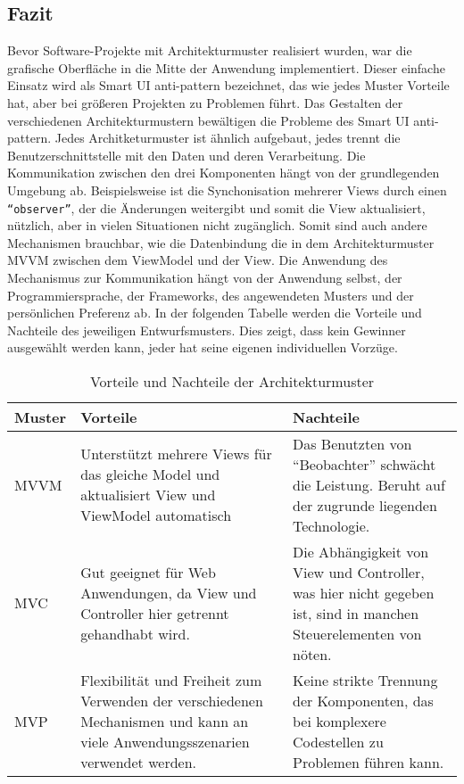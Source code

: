 \subsection{Fazit}
Bevor Software-Projekte mit Architekturmuster realisiert wurden, war die grafische Oberfl\"ache in die Mitte der Anwendung implementiert. Dieser einfache Einsatz wird als Smart \ac{UI} anti-pattern bezeichnet, das wie jedes Muster  Vorteile hat, aber bei gr\"o\ss{}eren Projekten zu Problemen f\"uhrt. Das Gestalten der verschiedenen Architekturmustern bew\"altigen die Probleme des Smart \ac{UI} anti-pattern. Jedes Architketurmuster ist \"ahnlich aufgebaut, jedes trennt die Benutzerschnittstelle mit den Daten und deren Verarbeitung. Die Kommunikation zwischen den drei Komponenten h\"angt von der grundlegenden Umgebung ab. Beispielsweise ist die Synchonisation mehrerer Views durch einen \texttt{\enquote{observer}}, der die \"Anderungen weitergibt und somit die View aktualisiert, n\"utzlich, aber in vielen Situationen nicht zug\"anglich. Somit sind auch andere Mechanismen brauchbar, wie die Datenbindung die in dem Architekturmuster \ac{MVVM} zwischen dem ViewModel und der View. Die Anwendung des Mechanismus zur Kommunikation h\"angt von der Anwendung selbst, der Programmiersprache, der Frameworks, des angewendeten Musters und der pers\"onlichen Preferenz ab\cite{Bragge2013}. In der folgenden Tabelle\cite{Syromiatnikov2014} werden die Vorteile und Nachteile des jeweiligen Entwurfsmusters. Dies zeigt, dass kein Gewinner ausgew\"ahlt werden kann, jeder hat seine eigenen individuellen Vorz\"uge.
\begin{table}[H]
\centering
\caption{Vorteile und Nachteile der Architekturmuster}
\label{ProConsPattern}
\begin{tabular}{p{2cm}p{7cm}p{7cm}}
\toprule
Muster & Vorteile & Nachteile \\ \midrule
\ac{MVVM}              
& Unterst\"utzt mehrere Views f\"ur das gleiche Model und aktualisiert View und ViewModel automatisch
& 
Das Benutzten von \enquote{Beobachter} schw\"acht die Leistung. Beruht auf der zugrunde liegenden Technologie.  \\ \hline
\ac{MVC}     
 & 
Gut geeignet f\"ur Web Anwendungen, da View und Controller hier getrennt gehandhabt wird.
 &
 Die Abh\"angigkeit von View und Controller, was hier nicht gegeben ist, sind in manchen Steuerelementen von n\"oten.  \\ \hline
\ac{MVP}            
&
Flexibilit\"at und Freiheit zum Verwenden der verschiedenen Mechanismen und kann an viele Anwendungsszenarien verwendet werden. 
&
Keine strikte Trennung der Komponenten, das bei komplexere Codestellen zu Problemen f\"uhren kann.  
\\ \bottomrule
\end{tabular}
\end{table}
